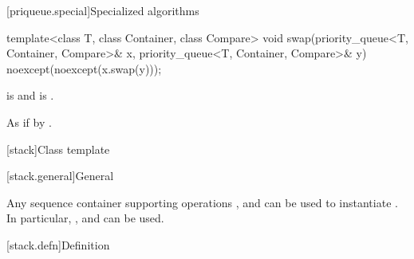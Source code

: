 [priqueue.special]{Specialized algorithms}

%
\begin{itemdecl}
template<class T, class Container, class Compare>
  void swap(priority_queue<T, Container, Compare>& x,
            priority_queue<T, Container, Compare>& y) noexcept(noexcept(x.swap(y)));
\end{itemdecl}

\begin{itemdescr}
\pnum
\constraints
{} is  and
 is .

\pnum
\effects
As if by .
\end{itemdescr}

[stack]{Class template }

[stack.general]{General}

\pnum
{}%
Any sequence container supporting operations
,
and
can be used to instantiate
.
In particular,
,
and
can be used.

[stack.defn]{Definition}


